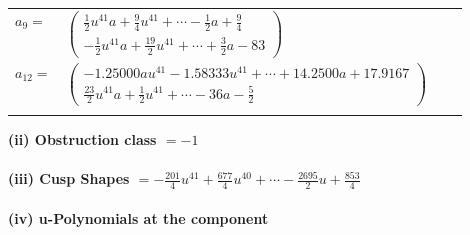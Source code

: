 \documentclass[1p]{elsarticle_modified}
\theoremstyle{definition}
\begin{document}
\begin{tabular}{m{7pt} m{180pt} m{7pt} m{180pt} }
\flushright $a_{9}=$&$\begin{pmatrix}\frac{1}{2} u^{41} a+\frac{9}{4} u^{41}+\cdots-\frac{1}{2} a+\frac{9}{4}\\-\frac{1}{2} u^{41} a+\frac{19}{2} u^{41}+\cdots+\frac{3}{2} a-83\end{pmatrix}$ \\
\flushright $a_{12}=$&$\begin{pmatrix}-1.25000 a u^{41}-1.58333 u^{41}+\cdots+14.2500 a+17.9167\\\frac{23}{2} u^{41} a+\frac{1}{2} u^{41}+\cdots-36 a-\frac{5}{2}\end{pmatrix}$\\&\end{tabular}
\flushleft \textbf{(ii) Obstruction class $= -1$}\\~\\
\flushleft \textbf{(iii) Cusp Shapes $= -\frac{201}{4} u^{41}+\frac{677}{4} u^{40}+\cdots-\frac{2695}{2} u+\frac{853}{4}$}\\~\\
\newpage\renewcommand{\arraystretch}{1}
\flushleft \textbf{(iv) u-Polynomials at the component}\newline \\
\end{document}
